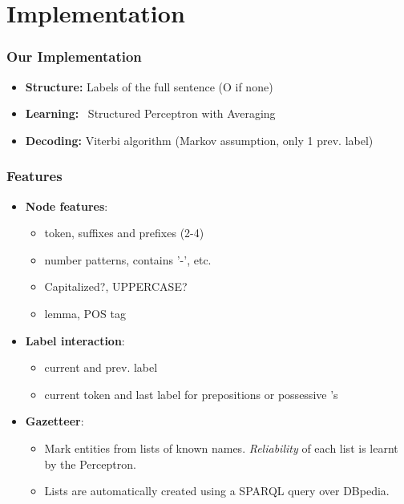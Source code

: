\documentclass[10pt]{beamer}
\begin{document}

\section{Implementation}
\begin{frame}
\frametitle{Our Implementation}

\begin{itemize}
 \item \textbf{Structure:} Labels of the full sentence (O if none)
 \item \textbf{Learning:} ~Structured Perceptron with Averaging
 \item \textbf{Decoding:} Viterbi algorithm (Markov assumption, only 1 prev. label)
\end{itemize}
\end{frame}



\begin{frame}
\frametitle{Features}

\begin{itemize}
 \item \textbf{Node features}: 
\begin{itemize}
	\item token, suffixes and prefixes (2-4)
	\item number patterns, contains '-', etc. 
	\item Capitalized?, UPPERCASE?
	\item lemma, POS tag
\end{itemize}

 \item \textbf{Label interaction}: 

\begin{itemize}
	\item current and prev. label
	\item current token and last label for prepositions or possessive 's 
\end{itemize}

 \item \textbf{Gazetteer}: 

\begin{itemize}
	\item Mark entities from lists of known names. \emph{Reliability} of each list is learnt by the Perceptron.
	\item Lists are automatically created using a SPARQL query over DBpedia. 
\end{itemize} 
\end{itemize} 
\end{frame}
\end{document}
